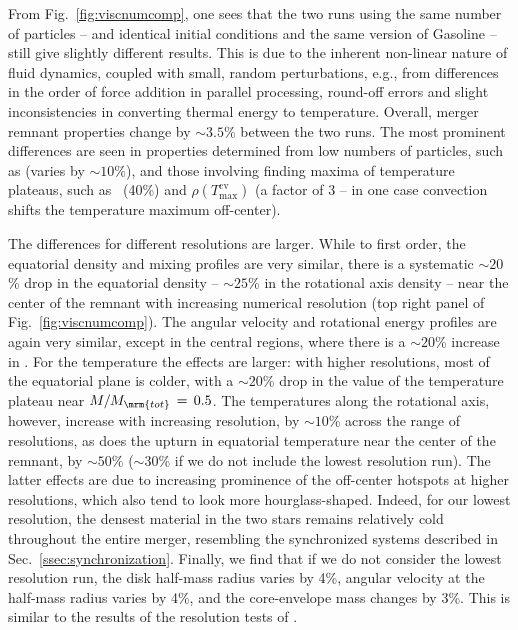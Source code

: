 From Fig.~\ref{fig:viscnumcomp}, one sees that the two runs using the same number of particles -- and identical initial conditions and the same version of Gasoline -- still give slightly different results.  This is due to the inherent non-linear nature of fluid dynamics, coupled with small, random perturbations, e.g., from differences in the order of force addition in parallel processing, round-off errors and slight inconsistencies in converting thermal energy to temperature.  Overall, merger remnant properties change by $\sim3.5$\% between the two runs.  The most prominent differences are seen in properties determined from low numbers of particles, such as {\Tc} (varies by $\sim10$\%), and those involving finding maxima of temperature plateaus, such as \zrhoTmax\ (40\%) and $\rho(T^\mathrm{cv}_\mathrm{max})$ (a factor of 3 -- in one case convection shifts the temperature maximum off-center).


The differences for different resolutions are larger.  While to first order, the equatorial density and mixing profiles are very similar, there is a systematic $\sim\!20$\% drop in the equatorial density -- $\sim\!25$\% in the rotational axis density -- near the center of the remnant with increasing numerical resolution (top right panel of Fig.~\ref{fig:viscnumcomp}).  The angular velocity and rotational energy profiles are again very similar, except in the central regions, where there is a $\sim\!20$\% increase in \Omegamax.  For the temperature the effects are larger: with higher resolutions, most of the equatorial plane is colder, with a $\sim20\!$\% drop in the value of the temperature plateau near $M/M_\mrm{tot}\,=\,0.5$.  The temperatures along the rotational axis, however, increase with increasing resolution, by $\sim\!10$\% across the range of resolutions, as does the upturn in equatorial temperature near the center of the remnant, by $\sim\!50$\% ($\sim\!30$\% if we do not include the lowest resolution run).  The latter effects are due to increasing prominence of the off-center hotspots at higher resolutions, which also tend to look more hourglass-shaped.  Indeed, for our lowest resolution, the densest material in the two stars remains relatively cold throughout the entire merger, resembling the synchronized systems described in Sec.~\ref{ssec:synchronization}.  Finally, we find that if we do not consider the lowest resolution run, the disk half-mass radius varies by 4\%, angular velocity at the half-mass radius varies by 4\%, and the core-envelope mass changes by 3\%.  This is similar to the results of the resolution tests of \cite{rask+12}.

